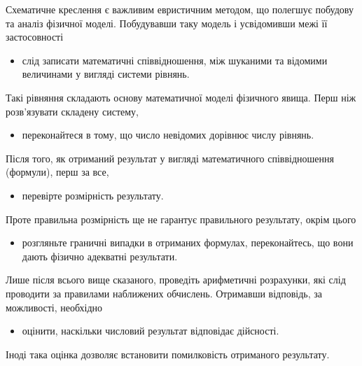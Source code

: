Схематичне креслення є важливим евристичним методом, що полегшує побудову та аналіз фізичної моделі. Побудувавши таку модель і усвідомивши межі її застосовності
\begin{itemize}
\item слід записати математичні співвідношення, між шуканими та відомими величинами у вигляді системи рівнянь.
\end{itemize}

Такі рівняння складають основу математичної моделі фізичного явища. Перш ніж розв'язувати складену систему, 
\begin{itemize}
\item переконайтеся в тому, що число невідомих дорівнює числу рівнянь.
\end{itemize}
 
Після того, як отриманий результат у вигляді математичного співвідношення (формули), перш за все, 
\begin{itemize}
\item перевірте розмірність результату.
\end{itemize} 

Проте правильна розмірність ще не гарантує правильного результату, окрім цього
\begin{itemize}
\item розгляньте граничні випадки в отриманих формулах, переконайтесь, що вони дають фізично адекватні результати.
\end{itemize}

Лише після всього вище сказаного, проведіть арифметичні розрахунки, які слід проводити за правилами наближених обчислень. Отримавши відповідь, за можливості, необхідно 
\begin{itemize}
\item оцінити, наскільки числовий результат відповідає дійсності.
\end{itemize}

Іноді така оцінка дозволяє встановити помилковість отриманого результату.

\introfalse





